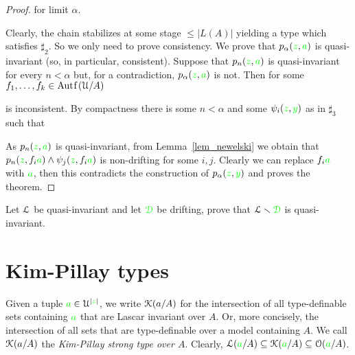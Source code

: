 \documentclass[creche.tex]{subfiles}
\begin{document}
\begin{proof}
\quad for limit $\alpha$.

\noindent Clearly, the chain stabilizes at some stage $\le|L(A)|$ yielding a type which satisfies $\sharp_2$. So we only need to prove consistency. We prove that $p_\alpha({\color{green} z},{\color{green} a})$ is quasi-invariant (so, in particular, consistent). Suppose that $p_n({\color{green} z},{\color{green} a})$ is quasi-invariant for every $n<\alpha$ but, for a contradiction, $p_\alpha({\color{green} z},{\color{green} a})$ is not. Then for some $f_1,\dots,f_k\in\mathord{\rm Aut\kern.15ex{f}\kern.15ex}(\EuScript U/A)$


\noindent is inconsistent. By compactness there is some $n<\alpha$ and some $\psi_i({\color{green} z},{\color{green} y})$ as in $\sharp_3$ such that


As $p_n({\color{green} z},{\color{green} a})$ is quasi-invariant, from Lemma~\ref{lem_newelski} we obtain that $p_n({\color{green} z},f_i{\color{green} a})\wedge\psi_j({\color{green} z},f_i{\color{green} a})$ is non-drifting for some $i,j$. Clearly we can replace $f_i{\color{green} a}$ with ${\color{green} a}$, then this contradicts the construction of $p_\alpha({\color{green} z},{\color{green} y})$ and proves the theorem.
\end{proof}

\begin{exercise}
Let $\EuScript L$ be quasi-invariant and let ${\color{green}\EuScript D}$ be drifting, prove that  $\EuScript L\smallsetminus{\color{green}\EuScript D}$ is quasi-invariant.\QED
\end{exercise}

\section{Kim-Pillay types}\label{KPtypes}


Given a tuple ${\color{green} a}\in\EuScript U^{|{\color{green} z}|}$, we write \emph{$\EuScript K(a/A)$\/} for the intersection of all type-definable sets containing ${\color{green} a}$ that are Lascar invariant over $A$. Or, more concisely, the intersection of all sets that are type-definable over a model containing $A$. We call $\EuScript K(a/A)$ the \emph{Kim-Pillay strong type over $A$}. Clearly,  $\EuScript L({\color{green} a}/A)\subseteq\EuScript K({\color{green} a}/A)\subseteq\EuScript O({\color{green} a}/A)$. 
\end{document}
